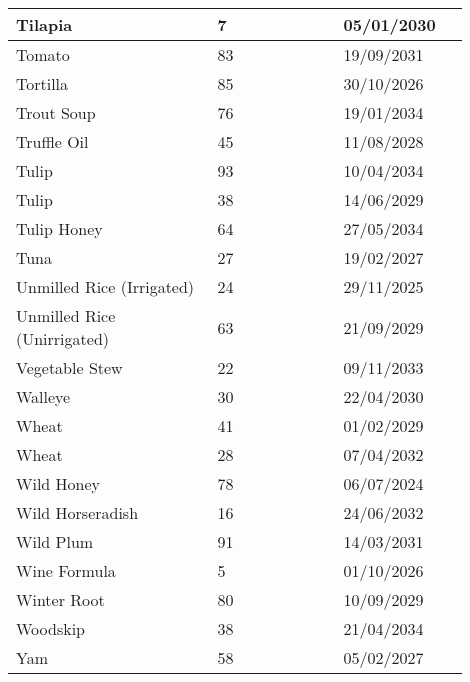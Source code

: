 \documentclass{article}
\begin{document}
\begin{longtable}{|p{0.4\linewidth}|p{0.25\linewidth}|p{0.25\linewidth}|}
\hline
Tilapia & 7 & 05/01/2030 \\
\hline
Tomato & 83 & 19/09/2031 \\
\hline
Tortilla & 85 & 30/10/2026 \\
\hline
Trout Soup & 76 & 19/01/2034 \\
\hline
Truffle Oil & 45 & 11/08/2028 \\
\hline
Tulip & 93 & 10/04/2034 \\
\hline
Tulip & 38 & 14/06/2029 \\
\hline
Tulip Honey & 64 & 27/05/2034 \\
\hline
Tuna & 27 & 19/02/2027 \\
\hline
Unmilled Rice (Irrigated) & 24 & 29/11/2025 \\
\hline
Unmilled Rice (Unirrigated) & 63 & 21/09/2029 \\
\hline
Vegetable Stew & 22 & 09/11/2033 \\
\hline
Walleye & 30 & 22/04/2030 \\
\hline
Wheat & 41 & 01/02/2029 \\
\hline
Wheat & 28 & 07/04/2032 \\
\hline
Wild Honey & 78 & 06/07/2024 \\
\hline
Wild Horseradish & 16 & 24/06/2032 \\
\hline
Wild Plum & 91 & 14/03/2031 \\
\hline
Wine Formula & 5 & 01/10/2026 \\
\hline
Winter Root & 80 & 10/09/2029 \\
\hline
Woodskip & 38 & 21/04/2034 \\
\hline
Yam & 58 & 05/02/2027 \\
\hline
\end{longtable}
\end{document}
